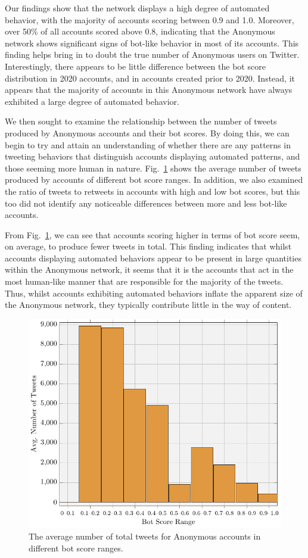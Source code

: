 \documentclass[letterpaper]{article}
\begin{document}
Our findings show that the network displays a high degree of automated behavior, with the majority of accounts scoring between 0.9 and 1.0. Moreover, over 50\% of all accounts scored above 0.8, indicating that the Anonymous network shows significant signs of bot-like behavior in most of its accounts. This finding helps bring in to doubt the true number of Anonymous users on Twitter. Interestingly, there appears to be little difference between the bot score distribution in 2020 accounts, and in accounts created prior to 2020. Instead, it appears that the majority of accounts in this Anonymous network have always exhibited a large degree of automated behavior.

We then sought to examine the relationship between the number of tweets produced by Anonymous accounts and their bot scores. By doing this, we can begin to try and attain an understanding of whether there are any patterns in tweeting behaviors that distinguish accounts displaying automated patterns, and those seeming more human in nature. Fig.~\ref{fig:botScoresTotalTweets} shows the average number of tweets produced by accounts of different bot score ranges. In addition, we also examined the ratio of tweets to retweets in accounts with high and low bot scores, but this too did not identify any noticeable differences between more and less bot-like accounts.

From Fig.~\ref{fig:botScoresTotalTweets}, we can see that accounts scoring higher in terms of bot score seem, on average, to produce fewer tweets in total. This finding indicates that whilst accounts displaying automated behaviors appear to be present in large quantities within the Anonymous network, it seems that it is the accounts that act in the most human-like manner that are responsible for the majority of the tweets. Thus, whilst accounts exhibiting automated behaviors inflate the apparent size of the Anonymous network, they typically contribute little in the way of content.

\begin{figure}[!ht]
\centering
\includegraphics[width=0.6\linewidth]{avg_tweets_bots.pdf}
\caption{The average number of total tweets for Anonymous accounts in different bot score ranges.}
\label{fig:botScoresTotalTweets}
\end{figure}
\end{document}
